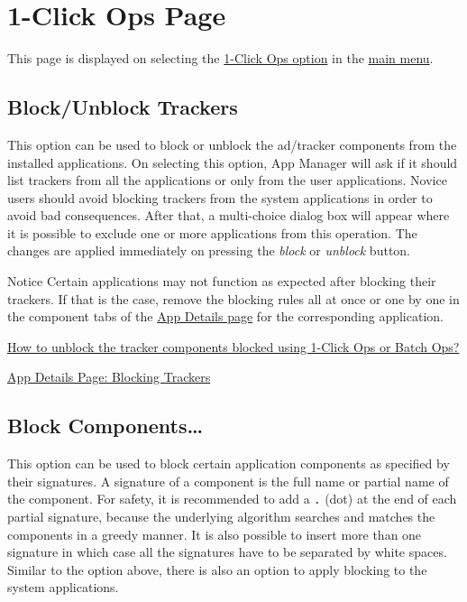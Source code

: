 \section{1-Click Ops Page}\label{sec:1-click-ops-page} %
This page is displayed on selecting the \hyperref[subsubsec:main:1-click-ops]{1-Click Ops option} in the \hyperref[subsec:main-page-options-menu]{main menu}.

\subsection{Block/Unblock Trackers}\label{subsec:block-unblock-trackers} %
This option can be used to block or unblock the ad/tracker components from the installed applications.
On selecting this option, App Manager will ask if it should list trackers from all the applications or only from the user applications.
Novice users should avoid blocking trackers from the system applications in order to avoid bad consequences.
After that, a multi-choice dialog box will appear where it is possible to exclude one or more applications from this operation.
The changes are applied immediately on pressing the \textit{block} or \textit{unblock} button.

\begin{warning}{Notice}
    Certain applications may not function as expected after blocking their trackers.
    If that is the case, remove the blocking rules all at once or one by one in the component tabs of the \hyperref[sec:app-details-page]{App Details page} for the corresponding application.
\end{warning}

\begin{amseealso}
    \item \hyperref[subsec:faq:how-to-unblock-tracker-components]{How to unblock the tracker components blocked using 1-Click Ops or Batch Ops?}
    \item \hyperref[par:appdetails:blocking-trackers]{App Details Page: Blocking Trackers}
\end{amseealso}

\subsection{Block Components\dots}\label{subsec:block-components-dots} %
This option can be used to block certain application components as specified by their signatures.
A signature of a component is the full name or partial name of the component.
For safety, it is recommended to add a \texttt{.} (dot) at the end of each partial signature, because the underlying
algorithm searches and matches the components in a greedy manner.
It is also possible to insert more than one signature in which case all the signatures have to be separated by white spaces.
Similar to the option above, there is also an option to apply blocking to the system applications.

